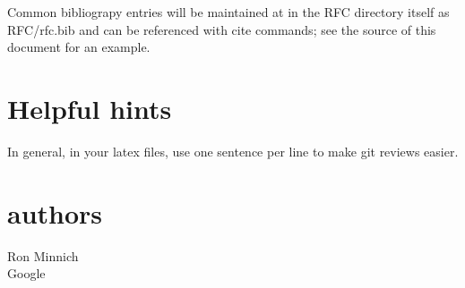 \documentclass{article}
\begin{document}
Common bibliograpy entries will be maintained at in the RFC directory itself as RFC/rfc.bib and can be referenced with cite commands; see the source of this document for an example.

\section{Helpful hints}
In general, in your latex files, use one sentence per line to make git reviews easier.

\section{authors}
Ron Minnich\\Google



\end{document}
